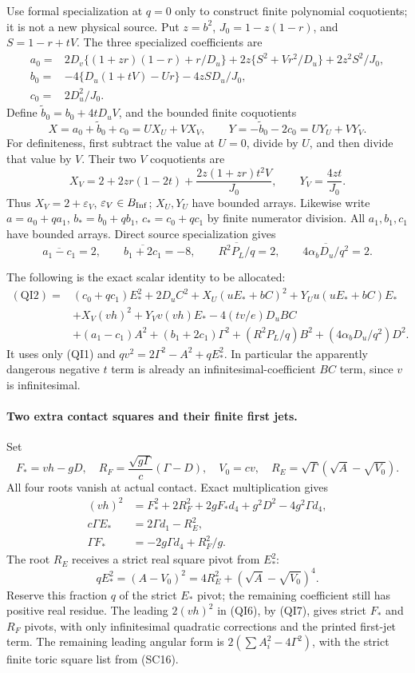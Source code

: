 Use formal specialization at $q=0$ only to construct finite polynomial
coquotients; it is not a new physical source. Put $z=b^2$,
$J_0=1-z(1-r)$, and $S=1-r+tV$. The three specialized coefficients are
\begin{align*}
 a_0={}&2D_v\{(1+zr)(1-r)+r/D_u\}
       +2z\{S^2+Vr^2/D_u\}+2z^2S^2/J_0,\\
 b_0={}&-4\{D_u(1+tV)-Ur\}-4zSD_u/J_0,\\
 c_0={}&2D_u^2/J_0.
\end{align*}
Define $\widetilde b_0=b_0+4tD_uV$, and the bounded finite
coquotients
\[
 X=a_0+\widetilde b_0+c_0=U X_U+V X_V,
 \qquad Y=-\widetilde b_0-2c_0=U Y_U+V Y_V.
 \tag{QI3}
\]
For definiteness, first subtract the value at $U=0$, divide by $U$,
and then divide that value by $V$. Their two $V$ coquotients are
\[
 X_V=2+2zr(1-2t)+\frac{2z(1+zr)t^2V}{J_0},
 \qquad Y_V=\frac{4zt}{J_0}.
 \tag{QI4}
\]
Thus $X_V=2+\varepsilon_V$, $\varepsilon_V\in B_{\rm Inf}$;
$X_U,Y_U$ have bounded arrays. Likewise write
$a=a_0+qa_1$, $b_*=b_0+qb_1$, $c_*=c_0+qc_1$ by finite numerator
division. All $a_1,b_1,c_1$ have bounded arrays. Direct source
specialization gives
\[
 \overline{a_1-c_1}=2,\qquad
 \overline{b_1+2c_1}=-8,\qquad
 \overline{R^2P_L/q}=2,\qquad
 \overline{4\alpha_bD_u/q^2}=2.
 \tag{QI5}
\]

The following is the exact scalar identity to be allocated:
\begin{align*}
 (\mathrm{QI2})={}&(c_0+qc_1)E_*^2+2D_uC^2
 +X_U(uE_*+bC)^2+Y_Uu(uE_*+bC)E_*\\
 &+X_V(vh)^2+Y_Vv(vh)E_*
 -4(t v/e)D_uBC\\
 &+(a_1-c_1)A^2+(b_1+2c_1)\Gamma^2
 +(R^2P_L/q)B^2+(4\alpha_bD_u/q^2)D^2.
 \tag{QI6}
\end{align*}
It uses only (QI1) and $qv^2=2\Gamma^2-A^2+qE_*^2$.
In particular the apparently dangerous negative $t$ term is already
an infinitesimal-coefficient $BC$ term, since $v$ is infinitesimal.

\paragraph{Two extra contact squares and their finite first jets.}
Set
\[
 F_*=vh-gD,\quad
 R_F=\frac{\sqrt{g\Gamma}}{c}(\Gamma-D),\quad
 V_0=cv,\quad R_E=\sqrt\Gamma(\sqrt A-\sqrt{V_0}).
\]
All four roots vanish at actual contact. Exact multiplication gives
\begin{align*}
 (vh)^2&=F_*^2+2R_F^2+2gF_*d_4+g^2D^2-4g^2\Gamma d_4,\\
 c\Gamma E_*&=2\Gamma d_1-R_E^2,\\
 \Gamma F_*&=-2g\Gamma d_4+R_F^2/g.
 \tag{QI7}
\end{align*}
The root $R_E$ receives a strict real square pivot from $E_*^2$:
\[
 qE_*^2=(A-V_0)^2
       =4R_E^2+(\sqrt A-\sqrt{V_0})^4.
 \tag{QI8}
\]
Reserve this fraction $q$ of the strict $E_*$ pivot; the remaining
coefficient still has positive real residue. The leading $2(vh)^2$
in (QI6), by (QI7), gives strict $F_*$ and $R_F$ pivots, with only
infinitesimal quadratic corrections and the printed first-jet term.
The remaining leading angular form is $2(\sum A_i^2-4\Gamma^2)$,
with the strict finite toric square list from (SC16).

